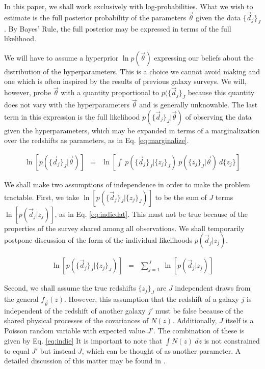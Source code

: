 \documentclass[preprint]{aastex}
\begin{document}
In this paper, we shall work exclusively with log-probabilities.  What we wish to estimate is the full posterior probability of the parameters $\vec{\theta}$ given the data $\{\vec{d}_{j}\}_{J}$.  By Bayes' Rule, the full posterior may be expressed in terms of the full likelihood.

We will have to assume a hyperprior $\ln p(\vec{\theta})$ expressing our beliefs about the distribution of the hyperparameters.  This is a choice we cannot avoid making and one which is often inspired by the results of previous galaxy surveys.  We will, however, probe $\vec{\theta}$ with a quantity proportional to $p(\{\vec{d}_{j}\}_{J}$ because this quantity does not vary with the hyperparameters $\vec{\theta}$ and is generally unknowable.  The last term in this expression is the full likelihood $p(\{\vec{d}_{j}\}_{J}|\vec{\theta})$ of observing the data given the hyperparameters, which may be expanded in terms of a marginalization over the redshifts as parameters, as in Eq. \ref{eq:marginalize}.  

\begin{eqnarray}
\label{eq:marginalize}
\ln[p(\{\vec{d}_{j}\}_{J}|\vec{\theta})] &=& \ln\left[\int\ p(\{\vec{d}_{j}\}_{J}|\{z_{j}\}_{J})\ p(\{z_{j}\}_{J}|\vec{\theta})\ d\{z_{j}\}\right]
\end{eqnarray}

We shall make two assumptions of independence in order to make the problem tractable.  First, we take $\ln[p(\{\vec{d}_{j}\}_{J}|\{z_{j}\}_{J})]$ to be the sum of $J$ terms $\ln[p(\vec{d}_{j}|z_{j})]$, as in Eq. \ref{eq:indiedat}.  This must not be true because of the properties of the survey shared among all observations.  We shall temporarily postpone discussion of the form of the individual likelihoods $p(\vec{d}_{j}|z_{j})$.  

\begin{eqnarray}
\label{eq:indiedat}
\ln[p(\{\vec{d}_{j}\}_{J}|\{z_{j}\}_{J})] &=& \sum_{j=1}^{J}\ \ln[p(\vec{d}_{j}|z_{j})]
\end{eqnarray}

Second, we shall assume the true redshifts $\{z_{j}\}_{J}$ are $J$ independent draws from the general $f_{\vec{\theta}}(z)$.  However, this assumption that the redshift of a galaxy $j$ is independent of the redshift of another galaxy $j'$ must be false because of the shared physical processes of the covariances of $N(z)$.  Additionally, $J$ itself is a Poisson random variable with expected value $J'$.  The combination of these is given by Eq. \ref{eq:indie}  It is important to note that $\int N(z)\ dz$ is not constrained to equal $J'$ but instead $J$, which can be thought of as another parameter.  A detailed discussion of this matter may be found in \citet{for14}.
\end{document}

